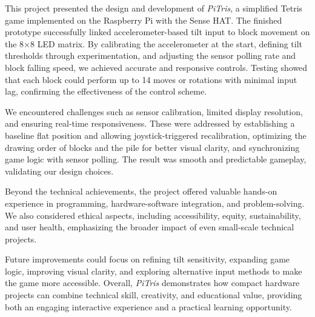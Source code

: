 \documentclass[12pt]{report}
\begin{document}
This project presented the design and development of \textit{PiTris}, a simplified Tetris game implemented on the Raspberry Pi with the Sense HAT. The finished prototype successfully linked accelerometer-based tilt input to block movement on the 8×8 LED matrix. By calibrating the accelerometer at the start, defining tilt thresholds through experimentation, and adjusting the sensor polling rate and block falling speed, we achieved accurate and responsive controls. Testing showed that each block could perform up to 14 moves or rotations with minimal input lag, confirming the effectiveness of the control scheme.

We encountered challenges such as sensor calibration, limited display resolution, and ensuring real-time responsiveness. These were addressed by establishing a baseline flat position and allowing joystick-triggered recalibration, optimizing the drawing order of blocks and the pile for better visual clarity, and synchronizing game logic with sensor polling. The result was smooth and predictable gameplay, validating our design choices.

Beyond the technical achievements, the project offered valuable hands-on experience in programming, hardware-software integration, and problem-solving. We also considered ethical aspects, including accessibility, equity, sustainability, and user health, emphasizing the broader impact of even small-scale technical projects.

Future improvements could focus on refining tilt sensitivity, expanding game logic, improving visual clarity, and exploring alternative input methods to make the game more accessible. Overall, \textit{PiTris} demonstrates how compact hardware projects can combine technical skill, creativity, and educational value, providing both an engaging interactive experience and a practical learning opportunity.








\end{document}
